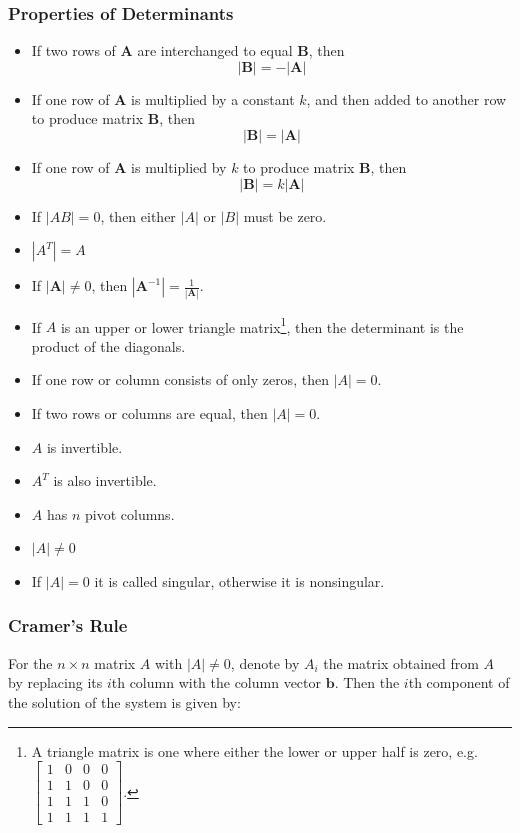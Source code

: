 \documentclass[12pt, landscape, twocolumn]{article}
\newcommand{\ma}[0]{\mathbf{A} }        %
\newcommand{\mb}[0]{\mathbf{B} }        %
\begin{document}
        \subsubsection{Properties of Determinants}
        \begin{itemize}
        \item If two rows of $\ma$ are interchanged to equal $\mb$, then
            \[ | \mb | = - | \ma | \]
        \item If one row of $\ma$ is multiplied by a constant $k$, and then added to another row to produce matrix $\mb$, then
            \[ | \mb | = | \ma | \]
        \item If one row of $\ma$ is multiplied by $k$ to produce matrix $\mb$, then
            \[ | \mb | = k | \ma | \]
        \item If $|AB| = 0$, then either $|A|$ or $|B|$ must be zero.
        \item $|A^T| = A$
        \item If $| \ma | \neq 0$, then $| \ma^{-1} | = \frac{1}{|\ma |}$.
        \item If $A$ is an upper or lower triangle matrix\footnote{A triangle matrix is one where either the lower or upper half is zero, e.g. $\left[\begin{array}{cccc}1 & 0 & 0 & 0\\1 & 1 & 0 & 0\\1 & 1 & 1 & 0\\1 & 1 & 1 & 1\end{array}\right]$.}, then the determinant is the product of the diagonals.
        \item If one row or column consists of only zeros, then $|A| = 0$.
        \item If two rows or columns are equal, then $|A|=0$.
        \item $A$ is invertible.
        \item $A^T$ is also invertible.
        \item $A$ has $n$ pivot columns.
        \item $|A| \neq 0$
        \item If $|A| = 0$ it is called singular, otherwise it is nonsingular.
        \end{itemize}

        \subsubsection{Cramer's Rule}
        For the $n \times n$ matrix $A$ with $|A| \neq 0$, denote by $A_i$ the matrix obtained from $A$ by replacing its $i$th column with the column vector $\mathbf{b}$. Then the $i$th component of the solution of the system is given by:
\end{document}
